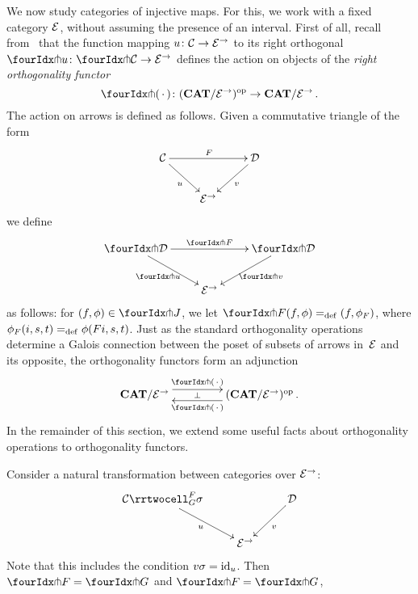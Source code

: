 \documentclass[reqno,10pt,a4paper,oneside]{amsart}
\begin{document}
  \medskip
  
We now study categories of injective maps. For this, we work with a fixed category $\mathcal{E}$, without assuming the presence of an interval. First of all, recall from~\cite{garner:small-object-argument} that the function mapping $u \colon \mathcal{C} \to \mathcal{E}^\to$ to its right orthogonal $\liftr{u} \co \liftr{\cal{C}} \to \cal{E}^\to$ defines the action on objects of the \emph{right orthogonality functor}
\[
\liftr{\brarghole} \co  (\CAT/\catE^{\to})^{\op} \to \CAT/\catE^{\to} \, .
\]
The action  on arrows is defined as follows. Given a commutative triangle of the form
\[
\xymatrix{
\cal{C} \ar[dr]_u \ar[rr]^F & & \cal{D} \ar[dl]^{v} \\
 & \catE^\to }
 \]
we define 
\[
\xymatrix{
\liftr{\cal{D}} \ar[dr]_{\liftr{u}} \ar[rr]^{\liftr{F}} & & \liftr{\cal{D}} \ar[dl]^{\liftr{v}} \\
 & \catE^\to }
\]
as follows: for $(f, \phi) \in \liftr{J}$, we let $\liftr{F}(f,\phi) \defeq (f, \phi_F)$, where $\phi_F(i, s, t) =_{\operatorname{def}} \phi(Fi, s, t)$. 
Just as the standard orthogonality operations determine a Galois connection between the poset of subsets of arrows in~$\mathcal{E}$ and its opposite, the orthogonality functors form an adjunction 
\begin{equation}
\label{garner-adjunction}
\begin{gathered}
\xymatrix@C+2em{
  \CAT/\catE^{\to}
  \ar@<5pt>[r]^-{\liftl{\brarghole}}
  \ar@{}[r]|-{\bot}
&
  (\CAT/\catE^{\to})^{\op} \, .
  \ar@<5pt>[l]^-{\liftr{\brarghole}}
}
\end{gathered}
\end{equation}
In the remainder of this section, we extend some useful facts about orthogonality operations to orthogonality functors.






\begin{proposition}
Consider a natural transformation between categories over $\mathcal{E}^{\to}$:
\[
\xymatrix{
  \cal{C}
  \rrtwocell_G^F{\sigma}
 \ar[dr]_{u}
&&
  \cal{D}
  \ar[dl]^{v}
\\&
  \catE^{\to}
}
\]
Note that this includes the condition $v \sigma = \operatorname{id}_u$.
Then $\liftr{F} = \liftr{G}$ and $\liftl{F} = \liftl{G}$, 
\end{proposition}
\end{document}
